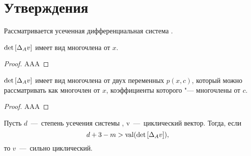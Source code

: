 \section{Утверждения}

Рассматривается усеченная дифференциальная система .


\begin{proposition}
    $\mathop{\rm det}\text{$ [\Delta_A v] $}$ имеет вид многочлена от $x$.
\end{proposition}

\begin{proof}
    AAA
\end{proof}


\begin{proposition}
    $\mathop{\rm det}\text{$ [\Delta_A v] $}$ имеет вид многочлена от двух переменных $p(x, c)$,
    который можно рассматривать как многочлен от $x$, коэффициенты которого "--- многочлены от $c$.
\end{proposition}

\begin{proof}
    AAA
\end{proof}


\begin{proposition}
Пусть $d$~---~степень усечения системы , v~---~циклический вектор. Тогда, если
\begin{equation}
	d + 3 - m > \mathop{\rm val}(\mathop{\rm det}\text{$ [\Delta_A v] $}),
	\label{d3m}
\end{equation}
то $v$~---~сильно циклический.

\end{proposition}

